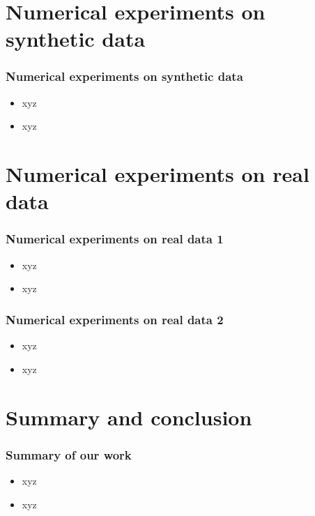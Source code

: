 \documentclass{beamer}
\begin{document}
\section{Numerical experiments on synthetic data}  \label{sec:NumExpSyn}

\begin{frame}
\frametitle{Numerical experiments on synthetic data}
\begin{itemize}
\item xyz
\item xyz
\end{itemize}
\end{frame}


\section{Numerical experiments on real data}   \label{sec:NumExpReal}

\begin{frame}
\frametitle{Numerical experiments on real data 1}
\begin{itemize}
\item xyz
\item xyz
\end{itemize}
\end{frame}

\begin{frame}
\frametitle{Numerical experiments on real data 2}
\begin{itemize}
\item xyz
\item xyz
\end{itemize}
\end{frame}




\section{Summary and conclusion}  \label{sec:conclusion}

\begin{frame}
\frametitle{Summary of our work}
\begin{itemize}
\item xyz
\item xyz
\end{itemize}
\end{frame}
\end{document}
